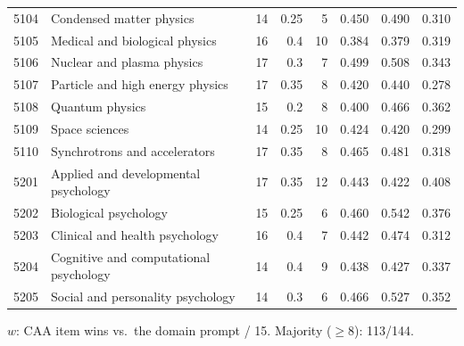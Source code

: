 \begin{longtable}{r p{3.35cm} rr r rrr}
5104 & Condensed matter physics & 14 & 0.25 & 5 & 0.450 & 0.490 & 0.310 \\
5105 & Medical and biological physics & 16 & 0.4 & 10 & 0.384 & 0.379 & 0.319 \\
5106 & Nuclear and plasma physics & 17 & 0.3 & 7 & 0.499 & 0.508 & 0.343 \\
5107 & Particle and high energy physics & 17 & 0.35 & 8 & 0.420 & 0.440 & 0.278 \\
5108 & Quantum physics & 15 & 0.2 & 8 & 0.400 & 0.466 & 0.362 \\
5109 & Space sciences & 14 & 0.25 & 10 & 0.424 & 0.420 & 0.299 \\
5110 & Synchrotrons and accelerators & 17 & 0.35 & 8 & 0.465 & 0.481 & 0.318 \\
5201 & Applied and developmental psychology & 17 & 0.35 & 12 & 0.443 & 0.422 & 0.408 \\
5202 & Biological psychology & 15 & 0.25 & 6 & 0.460 & 0.542 & 0.376 \\
5203 & Clinical and health psychology & 16 & 0.4 & 7 & 0.442 & 0.474 & 0.312 \\
5204 & Cognitive and computational psychology & 14 & 0.4 & 9 & 0.438 & 0.427 & 0.337 \\
5205 & Social and personality psychology & 14 & 0.3 & 6 & 0.466 & 0.527 & 0.352 \\
\end{longtable}
{\small $w$: CAA item wins vs.\ the domain prompt / 15. Majority ($\geq 8$): 113/144.}


